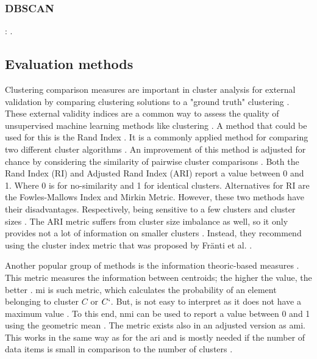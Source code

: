 \subsubsection{DBSCAN}:
.

\subsection{Evaluation methods} \label{theory:evaluate}
Clustering comparison measures are important in cluster analysis for external validation by comparing clustering solutions to a "ground truth" clustering \citep{vinh_information_nodate-2}.
These external validity indices are a common way to assess the quality of unsupervised machine learning methods like clustering \citep{warrens_understanding_2022}.
A method that could be used for this is the Rand Index \citep{rand_objective_1971}.
It is a commonly applied method for comparing two different cluster algorithms \citep{wagner_comparing_nodate}.
An improvement of this method is adjusted for chance by considering the similarity of pairwise cluster comparisons \citep{vinh_information_nodate-2}.
Both the Rand Index (RI) and Adjusted Rand Index (ARI) \citep{hubert_comparing_1985-1} report a value between 0 and 1.
Where 0 is for no-similarity and 1 for identical clusters.
Alternatives for RI are the Fowles-Mallows Index and Mirkin Metric.
However, these two methods have their disadvantages. Respectively, being sensitive to a few clusters and cluster sizes \citep{wagner_comparing_nodate}.
The ARI metric suffers from cluster size imbalance as well, so it only provides not a lot of information on smaller clusters \citep{warrens_understanding_2022}.
Instead, they recommend using the cluster index metric that was proposed by Fränti et al. \citep{franti_centroid_2014}.

Another popular group of methods is the information theoric-based measures \citep{vinh_information_nodate-2}.
This metric measures the information between centroids; the higher the value, the better \citep{vinh_information_nodate-2}.
\gls{mi} is such metric, which calculates the probability of an element belonging to cluster $C$ or $C`$.
But, is not easy to interpret as it does not have a maximum value \citep{wagner_comparing_nodate}.
To this end, \gls{nmi} can be used to report a value between 0 and 1 using the geometric mean \citep{strehl_cluster_2002}.
The metric exists also in an adjusted version as \gls{ami}.
This works in the same way as for the \gls{ari} and is mostly needed if the number of data items is small in comparison to the number of clusters \citep{vinh_information_nodate-2}. \newline

